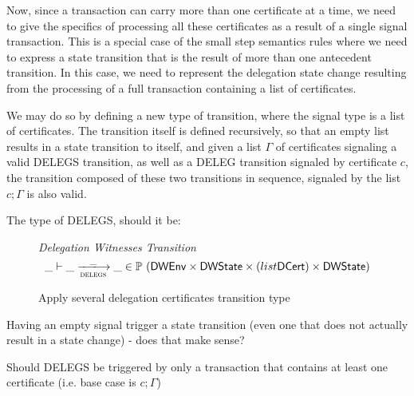Now, since a transaction can carry more than one certificate at a time, we need
to give the specifics of processing all these certificates as a result of
a single signal transaction. This is a special
case of the small step semantics rules where we need to express a
state transition that is the result of more than one antecedent transition.
In this case, we need to represent the delegation state change resulting
from the processing of a full transaction containing a list of certificates.

We may do so by defining a new type of transition, where the signal type is a
list of certificates. The transition itself is defined recursively, so that
an empty list results in a state transition to itself, and given
a list $\Gamma$ of certificates signaling a valid DELEGS transition, as well
as a DELEG transition signaled by certificate $c$, the transition
composed of these two transitions in sequence, signaled by the list $c; \Gamma$
is also valid.


\begin{note}
  The type of DELEGS, should it be:
\end{note}

\begin{figure}
\emph{Delegation Witnesses Transition}
\begin{equation*}
  \_ \vdash \_ \trans{delegs}{\_} \_ \in
    \powerset (
      \DWEnv \times \DWState \times (list \DCert) \times \DWState)
\end{equation*}
\caption{Apply several delegation certificates transition type}
\label{fig:type:delegations}
\end{figure}

\begin{note}
  Having an empty signal trigger a state transition (even one that does not
  actually result in a state change) - does that make sense?

  Should DELEGS be triggered by only a transaction that contains at
  least one certificate (i.e. base case is $c;\Gamma$)
\end{note}

